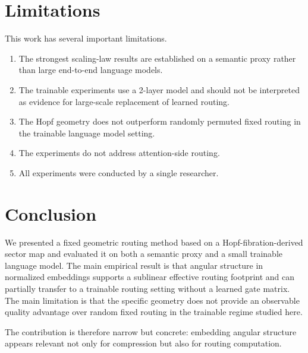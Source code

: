 \documentclass[10pt,twocolumn]{article}
\begin{document}
\section{Limitations}
This work has several important limitations.
\begin{enumerate}
    \item The strongest scaling-law results are established on a semantic proxy rather than large end-to-end language models.
    \item The trainable experiments use a 2-layer model and should not be interpreted as evidence for large-scale replacement of learned routing.
    \item The Hopf geometry does not outperform randomly permuted fixed routing in the trainable language model setting.
    \item The experiments do not address attention-side routing.
    \item All experiments were conducted by a single researcher.
\end{enumerate}

\section{Conclusion}
We presented a fixed geometric routing method based on a Hopf-fibration-derived sector map and evaluated it on both a semantic proxy and a small trainable language model. The main empirical result is that angular structure in normalized embeddings supports a sublinear effective routing footprint and can partially transfer to a trainable routing setting without a learned gate matrix. The main limitation is that the specific geometry does not provide an observable quality advantage over random fixed routing in the trainable regime studied here.

The contribution is therefore narrow but concrete: embedding angular structure appears relevant not only for compression but also for routing computation.
\end{document}
